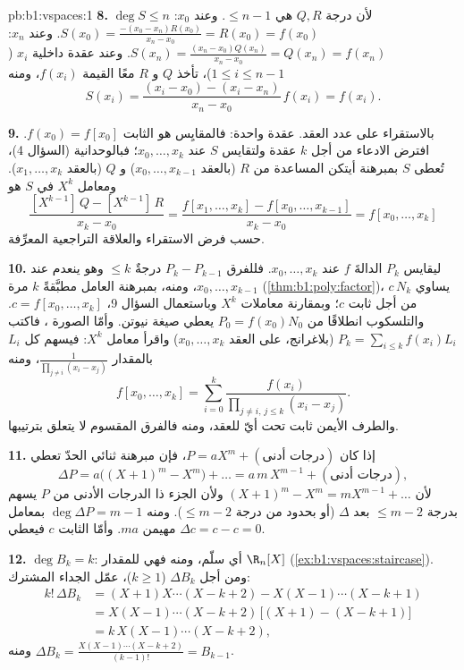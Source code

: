 \begin{solution}{pb:b1:vspaces:1}
\textbf{8.} $\deg S \leq n$ لأن درجة $Q, R$ هي $\leq n - 1$.
وعند $x_0$: $S(x_0) = \frac{-(x_0 - x_n) R(x_0)}{x_n - x_0} =
R(x_0) = f(x_0)$. وعند $x_n$: $S(x_n) = \frac{(x_n - x_0)
Q(x_n)}{x_n - x_0} = Q(x_n) = f(x_n)$. وعند عقدة داخلية $x_i$
($1 \leq i \leq n-1$)، تأخذ $Q$ و $R$ معًا القيمة $f(x_i)$،
ومنه
\[
S(x_i) = \frac{(x_i - x_0) - (x_i - x_n)}{x_n - x_0}\, f(x_i)
= f(x_i) .
\]

\textbf{9.} بالاستقراء على عدد العقد. عقدة واحدة: فالمقايِس
هو الثابت $f(x_0) = f[x_0]$. افترض الادعاء
من أجل $k$ عقدة ولتقايس $S$ عند $x_0, \dots, x_k$؛ فبالوحدانية
(السؤال 4)، تُعطى $S$ بمبرهنة أيتكن المساعدة من $R$
(بالعقد $x_0, \dots, x_{k-1}$) و $Q$ (بالعقد $x_1, \dots, x_k$).
ومعامل $X^{k}$ في $S$ هو
\[
\frac{[X^{k-1}]\,Q - [X^{k-1}]\,R}{x_k - x_0}
= \frac{f[x_1, \dots, x_k] - f[x_0, \dots, x_{k-1}]}{x_k - x_0}
= f[x_0, \dots, x_k]
\]
حسب فرض الاستقراء والعلاقة التراجعية المعرِّفة.

\textbf{10.} ليقايس $P_k$ الدالةَ $f$ عند $x_0, \dots, x_k$. فللفرق
$P_k - P_{k-1}$ درجةٌ $\leq k$ وهو ينعدم عند
$x_0, \dots, x_{k-1}$، ومنه، بمبرهنة العامل مطبَّقةً $k$ مرة
(\cref{thm:b1:poly:factor})، يساوي $c\,N_k$ من أجل ثابت $c$؛
وبمقارنة معاملات $X^{k}$ وباستعمال السؤال 9، $c =
f[x_0, \dots, x_k]$. والتلسكوب انطلاقًا من $P_0 = f(x_0) N_0$ يعطي
صيغة نيوتن. وأمّا الصورة ، فاكتب $P_k = \sum_{i \leq
k} f(x_i) L_i$ (بلاغرانج، على العقد $x_0, \dots, x_k$) واقرأ
معامل $X^{k}$: فيسهم كل $L_i$ بالمقدار
$\frac{1}{\prod_{j \neq i}(x_i - x_j)}$، ومنه
\[
f[x_0, \dots, x_k] = \sum_{i=0}^{k}
\frac{f(x_i)}{\prod_{j \neq i,\, j \leq k}(x_i - x_j)} .
\]
والطرف الأيمن ثابت تحت أيّ  للعقد، ومنه
فالفرق المقسوم لا يتعلق بترتيبها.

\textbf{11.} إذا كان $P = a X^m + (\text{درجات أدنى})$، فإن مبرهنة
ثنائي الحدّ تعطي
\[
\Delta P = a\bigl((X+1)^m - X^m\bigr) + \dots
= a\,m\,X^{m-1} + (\text{درجات أدنى}),
\]
لأن $(X+1)^m - X^m = m X^{m-1} + \dots$ ولأن الجزء ذا الدرجات الأدنى
من $P$ يسهم بدرجة $\leq m - 2$ بعد $\Delta$ (أو
بحدود من درجة $\leq m-2$). ومنه $\deg \Delta P = m - 1$ بمعامل
مهيمن $m a$. وأمّا الثابت $c$ فيعطي $\Delta c = c - c = 0$.

\textbf{12.} $\deg B_k = k$: أي سلّم، ومنه فهي  للمقدار
$\R_n[X]$ (\cref{ex:b1:vspaces:staircase}). ومن أجل $\Delta B_k$
($k \geq 1$)، عمّل الجداء المشترك:
\begin{align*}
k!\,\Delta B_k
&= (X+1)X\cdots(X-k+2) - X(X-1)\cdots(X-k+1) \\
&= X(X-1)\cdots(X-k+2)\,\bigl[(X+1) - (X-k+1)\bigr] \\
&= k\,X(X-1)\cdots(X-k+2),
\end{align*}
ومنه $\Delta B_k = \frac{X(X-1)\cdots(X-k+2)}{(k-1)!} = B_{k-1}$.


\end{solution}
